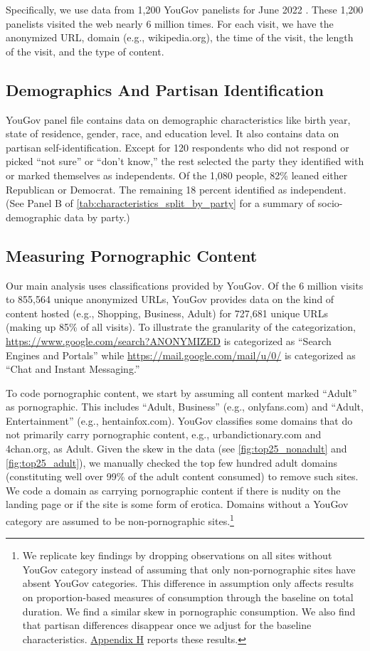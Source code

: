 \documentclass[12pt,twoside]{article}
\begin{document}
Specifically, we use data from 1,200 YouGov panelists for June 2022 \citep{data-dataverse}. These 1,200 panelists visited the web nearly 6 million times. For each visit, we have the anonymized URL, domain (e.g., wikipedia.org), the time of the visit, the length of the visit, and the type of content. 

\subsection{Demographics And Partisan Identification}
\label{subsec:demographics}
YouGov panel file contains data on demographic characteristics like birth year, state of residence, gender, race, and education level. It also contains data on partisan self-identification. Except for 120 respondents who did not respond or picked ``not sure'' or ``don't know,'' the rest selected the party they identified with or marked themselves as independents. Of the 1,080 people, 82\% leaned either Republican or Democrat. The remaining 18 percent identified as independent. (See Panel B of \cref{tab:characteristics_split_by_party} for a summary of socio-demographic data by party.)

\subsection{Measuring Pornographic Content}
\label{subsec:measuring_porn_content}

Our main analysis uses classifications provided by YouGov. Of the 6 million visits to 855,564 unique anonymized URLs, YouGov provides data on the kind of content hosted (e.g., Shopping, Business, Adult) for 727,681 unique URLs (making up 85\% of all visits). To illustrate the granularity of the categorization, \url{https://www.google.com/search?ANONYMIZED} is categorized as ``Search Engines and Portals'' while \url{https://mail.google.com/mail/u/0/} is categorized as ``Chat and Instant Messaging.'' 

To code pornographic content, we start by assuming all content marked ``Adult'' as pornographic. This includes ``Adult, Business'' (e.g., onlyfans.com) and ``Adult, Entertainment'' (e.g., hentainfox.com). YouGov classifies some domains that do not primarily carry pornographic content, e.g., urbandictionary.com and 4chan.org, as Adult. Given the skew in the data (see \cref{fig:top25_nonadult} and \cref{fig:top25_adult}), we manually checked the top few hundred adult domains (constituting well over 99\% of the adult content consumed) to remove such sites. We code a domain as carrying pornographic content if there is nudity on the landing page or if the site is some form of erotica. Domains without a YouGov category are assumed to be non-pornographic sites.\footnote{
    We replicate key findings by dropping observations on all sites without YouGov category instead of assuming that only non-pornographic sites have absent YouGov categories. 
    This difference in assumption only affects results on proportion-based measures of consumption through the baseline on total duration. 
    We find a similar skew in pornographic consumption. 
    We also find that partisan differences disappear once we adjust for the baseline characteristics. 
    \hyperref[sm:smH]{Appendix H} reports these results.
} 
\end{document}

